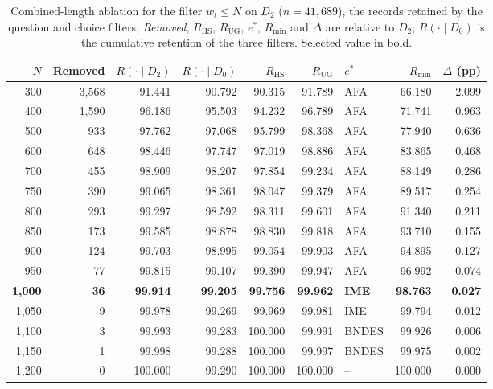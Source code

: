 \begin{table}[t]
\centering
\small
\setlength{\tabcolsep}{5pt}
\begin{tabular}{@{}rrrrrrlrr@{}}
\toprule
$N$ & Removed & $R(\cdot \mid D_2)$ & $R(\cdot \mid D_0)$ & $R_{\mathrm{HS}}$ & $R_{\mathrm{UG}}$ & $e^{*}$ & $R_{\min}$ & $\Delta$ (pp) \\
\midrule
300 & 3,568 & 91.441 & 90.792 & 90.315 & 91.789 & AFA & 66.180 & 2.099 \\
400 & 1,590 & 96.186 & 95.503 & 94.232 & 96.789 & AFA & 71.741 & 0.963 \\
500 & 933 & 97.762 & 97.068 & 95.799 & 98.368 & AFA & 77.940 & 0.636 \\
600 & 648 & 98.446 & 97.747 & 97.019 & 98.886 & AFA & 83.865 & 0.468 \\
700 & 455 & 98.909 & 98.207 & 97.854 & 99.234 & AFA & 88.149 & 0.286 \\
750 & 390 & 99.065 & 98.361 & 98.047 & 99.379 & AFA & 89.517 & 0.254 \\
800 & 293 & 99.297 & 98.592 & 98.311 & 99.601 & AFA & 91.340 & 0.211 \\
850 & 173 & 99.585 & 98.878 & 98.830 & 99.818 & AFA & 93.710 & 0.155 \\
900 & 124 & 99.703 & 98.995 & 99.054 & 99.903 & AFA & 94.895 & 0.127 \\
950 & 77 & 99.815 & 99.107 & 99.390 & 99.947 & AFA & 96.992 & 0.074 \\
\textbf{1,000} & \textbf{36} & \textbf{99.914} & \textbf{99.205} & \textbf{99.756} & \textbf{99.962} & \textbf{IME} & \textbf{98.763} & \textbf{0.027} \\
1,050 & 9 & 99.978 & 99.269 & 99.969 & 99.981 & IME & 99.794 & 0.012 \\
1,100 & 3 & 99.993 & 99.283 & 100.000 & 99.991 & BNDES & 99.926 & 0.006 \\
1,150 & 1 & 99.998 & 99.288 & 100.000 & 99.997 & BNDES & 99.975 & 0.002 \\
1,200 & 0 & 100.000 & 99.290 & 100.000 & 100.000 & -- & 100.000 & 0.000 \\
\bottomrule
\end{tabular}
\caption{Combined-length ablation for the filter $w_t \le N$ on $D_2$
($n = 41{,}689$), the records retained by the question and choice filters.
\emph{Removed}, $R_{\mathrm{HS}}$, $R_{\mathrm{UG}}$, $e^{*}$, $R_{\min}$ and
$\Delta$ are relative to $D_2$; $R(\cdot \mid D_0)$ is the cumulative
retention of the three filters. Selected value in bold.}
\label{tab:len-total}
\end{table}

